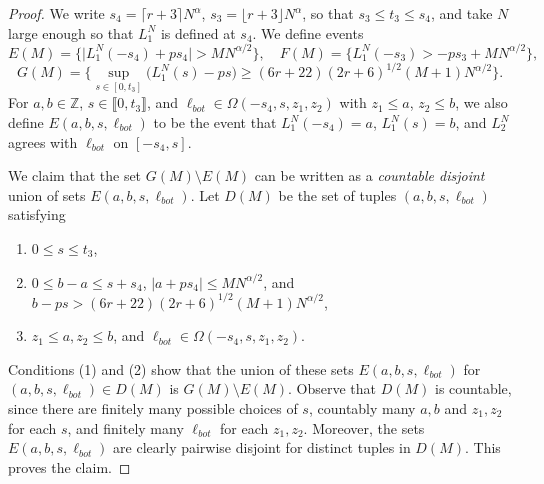 \begin{proof}
	We write $s_4 = \lceil r+3 \rceil N^\alpha$, $s_3 = \lfloor r+3 \rfloor N^\alpha$, so that $s_3 \leq t_3 \leq s_4$, and take $N$ large enough so that $L_1^N$ is defined at $s_4$. We define events 
	\[
	E(M) = \Big\{\big|L_1^N(-s_4) + ps_4\big| > MN^{\alpha/2}\Big\}, \quad F(M) = \Big\{L_1^N(-s_3) > -ps_3 + MN^{\alpha/2} \Big\},
	\]
	\[
	G(M) = \Bigg\{\sup_{s\in[0,t_3]} \big(L_1^N(s) - ps \big) \geq (6r+22)(2r+6)^{1/2}(M+1)N^{\alpha/2} \Bigg\}.
	\]
	For $a,b\in\mathbb{Z}$, $s\in\llbracket 0, t_3 \rrbracket$, and $\ell_{bot}\in\Omega(-s_4,s,z_1,z_2)$ with $z_1\leq a$, $z_2\leq b$, we also define $E(a,b,s,\ell_{bot})$ to be the event that $L_1^N(-s_4) = a$, $L_1^N(s) = b$, and $L_2^N$ agrees with $\ell_{bot}$ on $[-s_4,s]$. 
	
	We claim that the set $G(M) \setminus E(M)$ can be written as a \textit{countable disjoint} union of sets $E(a,b,s,\ell_{bot})$. Let $D(M)$ be the set of tuples $(a,b,s,\ell_{bot})$ satisfying
	\begin{enumerate}[label=(\arabic*)]
		
		\item $0\leq s\leq t_3$,
		
		\item $0\leq b-a \leq s + s_4$, $|a + ps_4| \leq MN^{\alpha/2}$, and $b-ps > (6r+22)(2r+6)^{1/2}(M+1)N^{\alpha/2}$,
		
		\item $z_1\leq a, z_2\leq b$, and $\ell_{bot}\in\Omega(-s_4, s, z_1, z_2)$.
		
	\end{enumerate}
	Conditions (1) and (2) show that the union of these sets $E(a,b,s,\ell_{bot})$ for $(a,b,s,\ell_{bot})\in D(M)$ is $G(M)\setminus E(M)$. Observe that $D(M)$ is countable, since there are finitely many possible choices of $s$, countably many $a,b$ and $z_1,z_2$ for each $s$, and finitely many $\ell_{bot}$ for each $z_1,z_2$. Moreover, the sets $E(a,b,s,\ell_{bot})$ are clearly pairwise disjoint for distinct tuples in $D(M)$. This proves the claim.
	

\end{proof}

